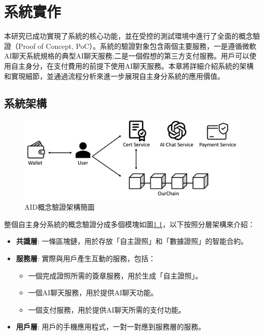 
\chapter{系統實作}
本研究已成功實現了系統的核心功能，並在受控的測試環境中進行了全面的概念驗證（Proof of Concept, PoC）。系統的驗證對象包含兩個主要服務，一是遵循微軟AI聊天系統規格\cite{microsoft_ai_chat_protocol}的典型AI聊天服務;二是一個假想的第三方支付服務。用戶可以使用自主身分，在支付費用的前提下使用AI聊天服務。本章將詳細介紹系統的架構和實現細節，並通過流程分析來進一步展現自主身分系統的應用價值。
\section{系統架構}
\begin{figure}
  \centering
  \includegraphics[width=\linewidth, keepaspectratio]{figures/implement.png}
  \caption{AID概念驗證架構簡圖}
  \label{fig:implement}
\end{figure}
整個自主身分系統的概念驗證分成多個模塊如圖\ref{fig:implement}，以下按照分層架構來介紹：
\begin{itemize}
  \item \textbf{共識層}: 一條區塊鏈，用於存放「自主證照」和「數據證照」的智能合約。
  \item \textbf{服務層}: 實際與用戶產生互動的服務，包括：
        \begin{itemize}
          \item 一個完成證照所需的簽章服務，用於生成「自主證照」。
          \item 一個AI聊天服務，用於提供AI聊天功能。
          \item 一個支付服務，用於提供AI聊天所需的支付功能。
        \end{itemize}
  \item \textbf{用戶層}: 用戶的手機應用程式，一對一對應到服務層的服務。
\end{itemize}
